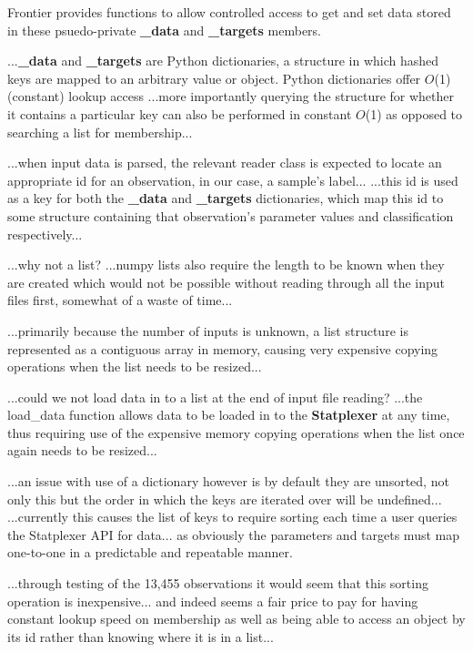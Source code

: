 Frontier provides functions to allow controlled access to get and set data
stored in these psuedo-private \textbf{\_data} and \textbf{\_targets} members.

...\textbf{\_data} and \textbf{\_targets} are Python dictionaries, a structure
in which hashed keys are mapped to an arbitrary value or object. Python
dictionaries offer $O$(1) (constant) lookup\citep{py:timecomplexity} access
...more importantly querying the structure for whether it contains a particular
key can also be performed in constant $O$(1) as opposed to searching a list for
membership...

...when input data is parsed, the relevant reader class is expected to locate an
appropriate id for an observation, in our case, a sample's label...
...this id is used as a key for both the \textbf{\_data} and \textbf{\_targets}
dictionaries, which map this id to some structure containing that observation's
parameter values and classification respectively...

...why not a list?
...numpy lists also require the length to be known when they are created which
would not be possible without reading through all the input files first,
somewhat of a waste of time...

...primarily because the number of inputs is unknown, a list structure is
represented as a contiguous array in memory, causing very expensive copying
operations when the list needs to be resized...

...could we not load data in to a list at the end of input file reading?
...the load\_data function allows data to be loaded in to the
\textbf{Statplexer} at any time, thus requiring use of the expensive memory
copying operations when the list once again needs to be resized...


...an issue with use of a dictionary however is by default they are unsorted,
not only this but the order in which the keys are iterated over will be
undefined...
...currently this causes the list of keys to require sorting each time a user
queries the Statplexer API for data... as obviously the parameters and targets
must map one-to-one in a predictable and repeatable manner.

...through testing of the 13,455 observations it would seem that this sorting
operation is inexpensive... and indeed seems a fair price to pay for having
constant lookup speed on membership as well as being able to access an object by
its id rather than knowing where it is in a list...


